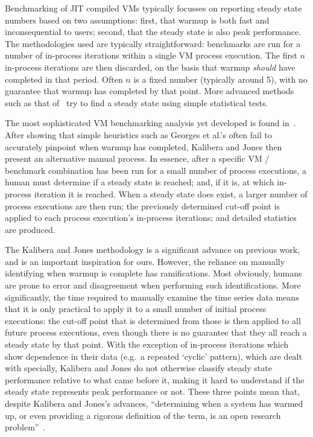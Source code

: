 \documentclass[acmsmall,screen]{acmart}
\newcommand{\kalibera}{Kalibera and Jones\xspace}
\begin{document}
Benchmarking of JIT compiled VMs typically focusses on reporting
steady state numbers based on two assumptions: first, that warmup is both fast and
inconsequential to users; second, that the steady state is also peak performance.
The methodologies used are typically straightforward: benchmarks are run for a number
of in-process iterations within a single VM process execution.
The first $n$ in-process iterations
are then discarded, on the basis that warmup \emph{should} have completed in
that period. Often $n$ is a fixed number (typically around 5), with no guarantee
that warmup has completed by that point. More advanced methods such as
that of~\citet{georges07statistically} try to find a steady state
using simple statistical tests.

The most sophisticated VM benchmarking analysis yet developed is found
in~\cite{kalibera12quantifying,kalibera13rigorous}. After
showing that simple heuristics such as Georges et al.'s often fail to accurately
pinpoint when warmup has completed, \kalibera then present an alternative manual
process. In essence, after a specific VM / benchmark combination has been run for a small number of
process executions, a human must determine if a steady state is reached;
and, if it is, at which in-process iteration
it is reached. When a steady state does exist, a larger number of process executions are then
run; the previously determined cut-off point is applied to each process execution's
in-process iterations; and detailed statistics are produced.

The \kalibera methodology is a significant advance on previous work,
and is an important inspiration for ours. However, the reliance
on manually identifying when warmup is complete has ramifications. Most
obviously, humans are prone to error and disagreement when performing
such identifications. More significantly, the time required
to manually examine the time series data means that it is only practical to apply it to a small number
of initial process executions: the cut-off point that is determined from those
is then applied to all future process executions, even though there is no
guarantee that they all reach a steady state by that point. With
the exception of in-process iterations which show dependence in their data (e.g.~a
repeated `cyclic' pattern), which are dealt with specially,
\kalibera do not otherwise classify
steady state performance relative to what came before it, making
it hard to understand if the steady state represents peak performance
or not. These three points mean that,
despite \kalibera's advances,
``determining when a system has warmed up, or even providing a
rigorous definition of the term, is an open research problem''~\cite{seaton15phd}.
\end{document}
